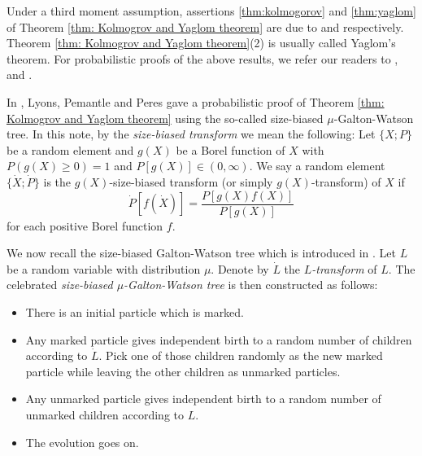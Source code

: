 \documentclass[12pt,a4paper]{amsart}
\numberwithin{equation}{section}
\begin{document}
	Under a third moment assumption, assertions \eqref{thm:kolmogorov} and \eqref{thm:yaglom} of Theorem \ref{thm: Kolmogrov and Yaglom theorem} are due to \cite{kolmogorov1938losung} and \cite{yaglom1947certain} respectively. 
	Theorem \ref{thm: Kolmogrov and Yaglom theorem}(2) is usually called Yaglom's theorem.
	For probabilistic proofs of the above results, we refer our readers to 
\cite{geiger1999elementary}, \cite{geiger2000new} and \cite{lyons1995conceptual}.

	In \cite{lyons1995conceptual}, Lyons, Pemantle and Peres gave a probabilistic proof of Theorem \ref{thm: Kolmogrov and Yaglom theorem} using the so-called size-biased $\mu$-Galton-Watson tree.
	In this note, by the \emph{size-biased transform} we mean the following: Let $\{X;P\}$ be a random element and $g(X)$ be a Borel function of $X$ with $P(g(X) \geq 0) = 1$ and $P[g(X)]\in (0,\infty)$. 
	We say a random element $\{\dot X;\dot P\}$ is the $g(X)$-size-biased transform (or simply $g(X)$-transform) of $X$ if 
	\[
		\dot P[f(\dot X)] = \frac{ P[g(X)f(X)]}{P[g(X)]} 
	\]
	for each positive Borel function $f$.

	We now recall the size-biased Galton-Watson tree which is introduced in \cite{lyons1995conceptual}.
	Let $L$ be a random variable with distribution $\mu$.
	Denote by $\dot L$ the \emph{$L$-transform} of $L$.
	The celebrated \emph{size-biased $\mu$-Galton-Watson tree} is then constructed as follows:
\begin{itemize}
\item
	There is an initial particle which is marked.
\item
	Any marked particle gives independent birth to a random number of children according to $\dot L$. Pick one of those children randomly as the new marked particle while leaving the other children as unmarked particles.
\item
	Any unmarked particle gives independent birth to a random number of unmarked children according to $L$.
\item
	The evolution goes on.
\end{itemize}
\end{document}
